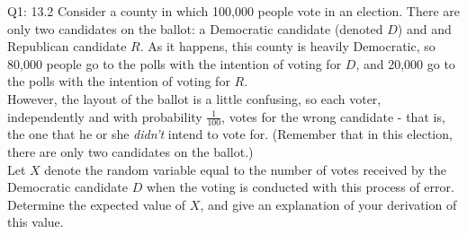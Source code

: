 \begin{problem}
    {Q1: 13.2}
    Consider a county in which 100,000 people vote in an election.
    There are only two candidates on the ballot: a Democratic candidate (denoted $D$) and
    and Republican candidate $R$. As it happens, this county is heavily Democratic, so 80,000
    people go to the polls with the intention of voting for $D$, and 20,000 go to the polls with the intention of voting for $R$.\\

    However, the layout of the ballot is a little confusing, so each voter, independently and with probability $\frac{1}{100}$, votes for the
    wrong candidate - that is, the one that he or she \textit{didn't} intend to vote for.
    (Remember that in this election, there are only two candidates on the ballot.)\\

    Let $X$ denote the random variable equal to the number of votes received by the Democratic candidate $D$ when the voting is conducted with this
    process of error. Determine the expected value of $X$, and give an explanation of your derivation of this value.
\end{problem}
